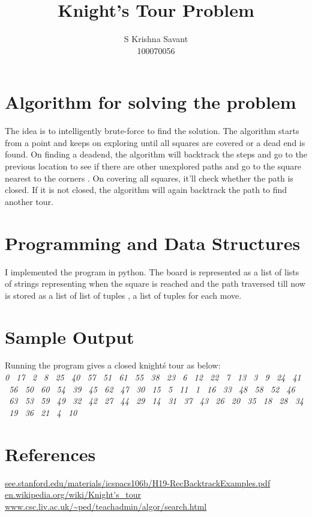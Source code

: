 \documentclass[a4paper,12pt]{article}
\begin{document}
    \title{Knight's Tour Problem}
    \author{S Krishna Savant \\ 100070056}
    \maketitle

    \section{Algorithm for solving the problem}
    
    \begin{comment}
    Upload a pdf file with your sample output for 

    knight's tour in the format explained below.

    1. Brief explanation of main algorithm/idea.

    2. brief details on the prog. lang, data structures.

    2. sample output as explained in class/here
    \end{comment}
    
    The idea is to intelligently brute-force to find the solution. The 
    algorithm starts from a point and keeps on exploring until all squares 
    are covered or a dead end is found. On finding a deadend, the algorithm 
    will backtrack the steps and go to the previous location to see if there
    are other unexplored paths and go to the square nearest to the corners 
    . On covering all squares, it'll
    check whether the path is closed. If it is not closed, the algorithm will
    again backtrack the path to find another tour.
    
    \section{Programming and Data Structures}
    I implemented the program in python. The board is represented as a list of lists
    of strings representing when the square is reached and the path traversed till now
    is stored as a list of list of tuples , a list of tuples for each move.
    
    \section{Sample Output}
    Running the program gives a closed knight\'s tour as below: \\   
    \emph{
    0 \ 17 \ 2 \ 8 \ 25 \ 40 \ 57 \ 51 \ 61 \ 55 \ 38 \ 23 \ 6 \ 12 \ 22 \ 7 \ 13 \ 3 \ 9 \ 24 \ 41 \ 56 \ 50 \ 60 \ 54 \ 39 \ 45 \ 62 \ 47 \ 30 \ 15 \ 5 \ 11 \ 1 \ 16 \ 33 \ 48 \ 58 \ 52 \ 46 \ 63 \ 53 \ 59 \ 49 \ 32 \ 42 \ 27 \ 44 \ 29 \ 14 \ 31 \ 37 \ 43 \ 26 \ 20 \ 35 \ 18 \ 28 \ 34 \ 19 \ 36 \ 21 \ 4 \ 10 \ 
    }

    \section{\small{References}}
        \url{see.stanford.edu/materials/icspacs106b/H19-RecBacktrackExamples.pdf} \\
        \url{en.wikipedia.org/wiki/Knight's_tour} \\
        \url{www.csc.liv.ac.uk/~ped/teachadmin/algor/search.html} \\
\end{document}
